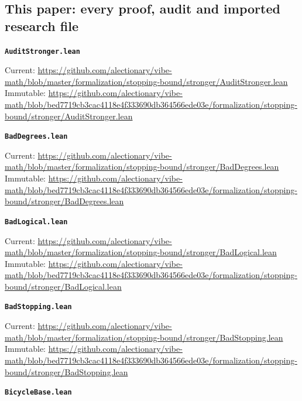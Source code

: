 \subsection{This paper: every proof, audit and imported research file}
\medskip
\par\noindent\textbf{\texttt{AuditStronger.lean}}\par\nopagebreak
{\footnotesize\noindent Current: \url{https://github.com/alectionary/vibe-math/blob/master/formalization/stopping-bound/stronger/AuditStronger.lean}\\
Immutable: \url{https://github.com/alectionary/vibe-math/blob/bed7719cb3cac4118e4f333690db364566ede03e/formalization/stopping-bound/stronger/AuditStronger.lean}\par}
\smallskip
\medskip
\par\noindent\textbf{\texttt{BadDegrees.lean}}\par\nopagebreak
{\footnotesize\noindent Current: \url{https://github.com/alectionary/vibe-math/blob/master/formalization/stopping-bound/stronger/BadDegrees.lean}\\
Immutable: \url{https://github.com/alectionary/vibe-math/blob/bed7719cb3cac4118e4f333690db364566ede03e/formalization/stopping-bound/stronger/BadDegrees.lean}\par}
\smallskip
\medskip
\par\noindent\textbf{\texttt{BadLogical.lean}}\par\nopagebreak
{\footnotesize\noindent Current: \url{https://github.com/alectionary/vibe-math/blob/master/formalization/stopping-bound/stronger/BadLogical.lean}\\
Immutable: \url{https://github.com/alectionary/vibe-math/blob/bed7719cb3cac4118e4f333690db364566ede03e/formalization/stopping-bound/stronger/BadLogical.lean}\par}
\smallskip
\medskip
\par\noindent\textbf{\texttt{BadStopping.lean}}\par\nopagebreak
{\footnotesize\noindent Current: \url{https://github.com/alectionary/vibe-math/blob/master/formalization/stopping-bound/stronger/BadStopping.lean}\\
Immutable: \url{https://github.com/alectionary/vibe-math/blob/bed7719cb3cac4118e4f333690db364566ede03e/formalization/stopping-bound/stronger/BadStopping.lean}\par}
\smallskip
\medskip
\par\noindent\textbf{\texttt{BicycleBase.lean}}\par\nopagebreak
